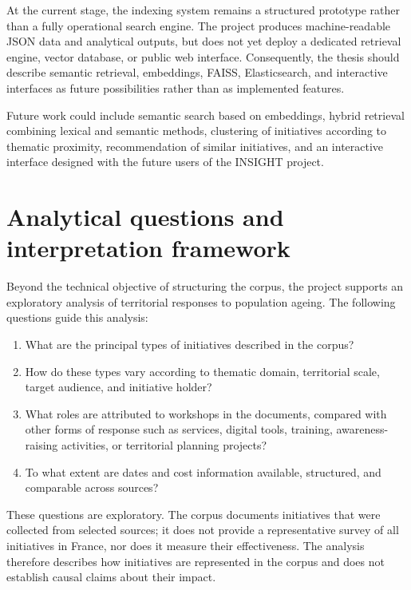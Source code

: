 \documentclass[
11pt,
english,
singlespacing,
headsepline,
]{MastersDoctoralThesis}
\begin{document}
At the current stage, the indexing system remains a structured prototype rather
than a fully operational search engine. The project produces machine-readable
JSON data and analytical outputs, but does not yet deploy a dedicated retrieval
engine, vector database, or public web interface. Consequently, the thesis
should describe semantic retrieval, embeddings, FAISS, Elasticsearch, and
interactive interfaces as future possibilities rather than as implemented
features.

Future work could include semantic search based on embeddings, hybrid retrieval
combining lexical and semantic methods, clustering of initiatives according to
thematic proximity, recommendation of similar initiatives, and an interactive
interface designed with the future users of the INSIGHT project.

\section{Analytical questions and interpretation framework}

Beyond the technical objective of structuring the corpus, the project supports
an exploratory analysis of territorial responses to population ageing. The
following questions guide this analysis:

\begin{enumerate}
    \item What are the principal types of initiatives described in the corpus?
    \item How do these types vary according to thematic domain, territorial
    scale, target audience, and initiative holder?
    \item What roles are attributed to workshops in the documents, compared with
    other forms of response such as services, digital tools, training,
    awareness-raising activities, or territorial planning projects?
    \item To what extent are dates and cost information available, structured,
    and comparable across sources?
\end{enumerate}

These questions are exploratory. The corpus documents initiatives that were
collected from selected sources; it does not provide a representative survey of
all initiatives in France, nor does it measure their effectiveness. The analysis
therefore describes how initiatives are represented in the corpus and does not
establish causal claims about their impact.
\end{document}
